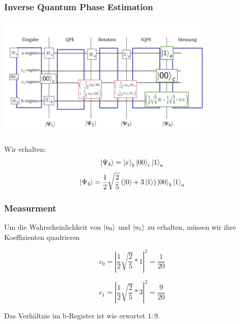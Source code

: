 \begin{frame}
    \frametitle{Inverse Quantum Phase Estimation}
    \begin{center}
    \includegraphics[width=10.5cm]{img/example_circuit/example_circuit_4.jpg}
    \end{center}

Wir erhalten:
$$\ket{\Psi_4}= \ket{x}_b \ket{00}_c \ket{1}_a $$
$$ \ket{\Psi_4}=\frac{1}{2}\sqrt{\frac{2}{5}}  \left(\ket{0} +3 \ket{1} \right) \ket{00}_b \ket{1}_a$$
\end{frame}


\begin{frame}
    \frametitle{Measurment}

Um die Wahrscheinlichkeit von $ \ket{u_0}$ und $\ket{u_1}$ zu erhalten, müssen wir ihre Koeffizienten quadrieren

$$ c_0=\left|\frac{1}{2}\sqrt{\frac{2}{5}}*1\right|^2 = \frac{1}{20} $$

$$ c_1=\left|\frac{1}{2}\sqrt{\frac{2}{5}}*3\right|^2 = \frac{9}{20} $$

Das Verhältnis im b-Register ist wie erwartet $1:9$.

\end{frame}






